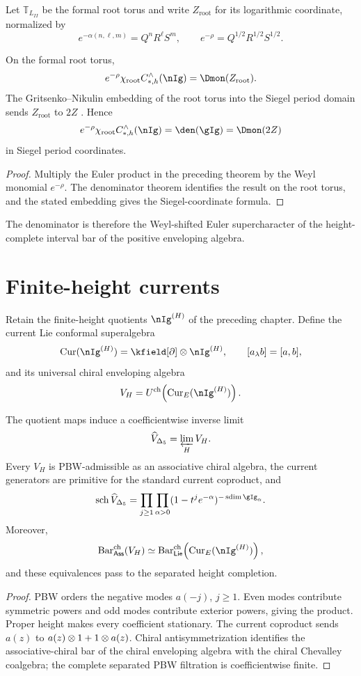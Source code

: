 Let $\mathbb T_{L_{II}}$ be the formal root torus and write $Z_{\mathrm{root}}$ for its logarithmic coordinate, normalized by
\[
 e^{-\alpha(n,\ell,m)}=Q^nR^\ell S^m,
 \qquad
 e^{-\rho}=Q^{1/2}R^{1/2}S^{1/2}.
\]

\begin{corollary}
On the formal root torus,
\[
 e^{-\rho}\chi_{\mathrm{root}}
 C_{*,h}^\wedge(\nIg)
 =\Dmon(Z_{\mathrm{root}}).
\]
The Gritsenko--Nikulin embedding of the root torus into the Siegel period domain sends $Z_{\mathrm{root}}$ to $2Z$ \cite{GN97,GN98b}. Hence
\[
 e^{-\rho}\chi_{\mathrm{root}}
 C_{*,h}^\wedge(\nIg)
 =\den(\gIg)=\Dmon(2Z)
\]
in Siegel period coordinates.
\end{corollary}
\begin{proof}
Multiply the Euler product in the preceding theorem by the Weyl monomial $e^{-\rho}$.  The denominator theorem identifies the result on the root torus, and the stated embedding gives the Siegel-coordinate formula.
\end{proof}

The denominator is therefore the Weyl-shifted Euler supercharacter of the height-complete interval bar of the positive enveloping algebra.

\chapter{Finite-height currents}
Retain the finite-height quotients $\nIg^{(H)}$ of the preceding chapter.  Define the current Lie conformal superalgebra
\[
 \Cur(\nIg^{(H)})=\kfield[\partial]\tensor\nIg^{(H)},
 \qquad [a_\lambda b]=[a,b],
\]
and its universal chiral enveloping algebra
\[
 V_H=U^{\ch}\!\left(\Cur_E(\nIg^{(H)})\right).
\]

\begin{theorem}
The quotient maps induce a coefficientwise inverse limit
\[
 \widehat V_{\Delta_5}=\varprojlim_HV_H.
\]
Every $V_H$ is PBW-admissible as an associative chiral algebra, the current generators are primitive for the standard current coproduct, and
\[
 \sch\widehat V_{\Delta_5}
 =\prod_{j\ge1}\prod_{\alpha>0}
 (1-t^je^{-\alpha})^{-\sdim\gIg_\alpha}.
\]
Moreover,
\[
 \BarAssCh(V_H)
 \simeq
 \BarLieCh\!\left(\Cur_E(\nIg^{(H)})\right),
\]
and these equivalences pass to the separated height completion.
\end{theorem}
\begin{proof}
PBW orders the negative modes $a(-j)$, $j\ge1$.  Even modes contribute symmetric powers and odd modes contribute exterior powers, giving the product.  Proper height makes every coefficient stationary.  The current coproduct sends $a(z)$ to $a(z)\otimes1+1\otimes a(z)$.  Chiral antisymmetrization identifies the associative-chiral bar of the chiral enveloping algebra with the chiral Chevalley coalgebra; the complete separated PBW filtration is coefficientwise finite.
\end{proof}


